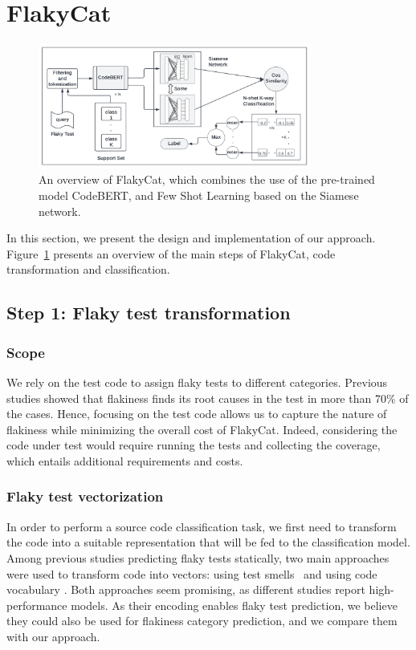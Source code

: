 \section{FlakyCat}
\label{sec:flakycat-flakycat}

\begin{figure}[htbp]
\centering
\includegraphics[width=0.8\textwidth,scale=1]{figures/flakycat/architecture.png}
\caption{An overview of FlakyCat, which combines the use of the pre-trained model CodeBERT, and Few Shot Learning based on the Siamese network.}
\label{fig:general_arch}
\end{figure}

In this section, we present the design and implementation of our approach.
Figure~\ref{fig:general_arch} presents an overview of the main steps of FlakyCat, code transformation and classification. 

\subsection{Step 1: Flaky test transformation}

\subsubsection{Scope} We rely on the test code to assign flaky tests to different categories.
Previous studies showed that flakiness finds its root causes in the test in more than 70\% of the cases\cite{Luo2014,Lam}. 
Hence, focusing on the test code allows us to capture the nature of flakiness while minimizing the overall cost of FlakyCat. 
Indeed, considering the code under test would require running the tests and collecting the coverage, which entails additional requirements and costs.



\subsubsection{Flaky test vectorization}
In order to perform a source code classification task, we first need to transform the code into a suitable representation that will be fed to the classification model. Among previous studies predicting flaky tests statically, two main approaches were used to transform code into vectors: using test smells~\cite{camara2021use,FlakeFlagger} and using code vocabulary \cite{pinto2020vocabulary,Haben2021,Camara2021VocabExtendedReplication}.
Both approaches seem promising, as different studies report high-performance models. As their encoding enables flaky test prediction, we believe they could also be used for flakiness category prediction, and we compare them with our approach. 


